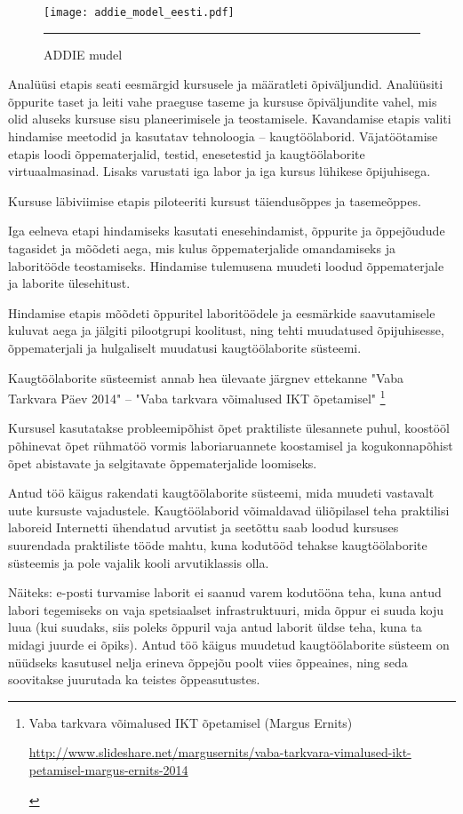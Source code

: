 \begin{figure}[H]
 \centering 
 \texttt{[image: addie\_model\_eesti.pdf]}
 \rule{35em}{0.5pt} 
 \caption{ADDIE mudel} 
 \label{figure:addie mudel} 
\end{figure}

Analüüsi etapis seati eesmärgid kursusele ja määratleti õpiväljundid. Analüüsiti õppurite taset ja leiti vahe praeguse taseme ja kursuse õpiväljundite vahel, mis olid aluseks kursuse sisu planeerimisele ja teostamisele. Kavandamise etapis valiti hindamise meetodid ja kasutatav tehnoloogia -- kaugtöölaborid. Väjatöötamise etapis loodi õppematerjalid, testid, enesetestid ja kaugtöölaborite virtuaalmasinad. Lisaks varustati iga labor ja iga kursus lühikese õpijuhisega. 

Kursuse läbiviimise etapis piloteeriti kursust täiendusõppes ja tasemeõppes.

Iga eelneva etapi hindamiseks kasutati enesehindamist, õppurite ja õppejõudude tagasidet ja mõõdeti aega, mis kulus õppematerjalide omandamiseks ja laboritööde teostamiseks. Hindamise tulemusena muudeti loodud õppematerjale ja laborite ülesehitust.

Hindamise etapis mõõdeti õppuritel laboritöödele ja eesmärkide saavutamisele kuluvat aega ja jälgiti pilootgrupi koolitust, ning tehti muudatused õpijuhisesse, õppematerjali ja hulgaliselt muudatusi kaugtöölaborite süsteemi.

Kaugtöölaborite süsteemist annab hea ülevaate järgnev ettekanne "Vaba Tarkvara Päev 2014" -- "Vaba tarkvara võimalused IKT õpetamisel" \footnote{Vaba tarkvara võimalused IKT õpetamisel (Margus Ernits) 
\begin{tiny}
\url{http://www.slideshare.net/margusernits/vaba-tarkvara-vimalused-ikt-petamisel-margus-ernits-2014}
\end{tiny}
}

Kursusel kasutatakse probleemipõhist õpet praktiliste ülesannete puhul, koostööl põhinevat õpet rühmatöö vormis laboriaruannete  koostamisel ja kogukonnapõhist õpet abistavate ja selgitavate õppematerjalide loomiseks.

Antud töö käigus rakendati kaugtöölaborite süsteemi, mida muudeti vastavalt uute kursuste vajadustele. Kaugtöölaborid võimaldavad üliõpilasel teha praktilisi laboreid Internetti ühendatud arvutist ja seetõttu saab loodud kursuses suurendada praktiliste tööde mahtu, kuna kodutööd tehakse kaugtöölaborite süsteemis ja pole vajalik kooli arvutiklassis olla. 

Näiteks: e-posti turvamise laborit ei saanud varem kodutööna teha, kuna antud labori tegemiseks on vaja spetsiaalset infrastruktuuri, mida õppur ei suuda koju luua (kui suudaks, siis poleks õppuril vaja antud laborit üldse teha, kuna ta midagi juurde ei õpiks). Antud töö käigus muudetud kaugtöölaborite süsteem on nüüdseks kasutusel nelja erineva õppejõu poolt viies õppeaines, ning seda soovitakse juurutada ka teistes õppeasutustes.


